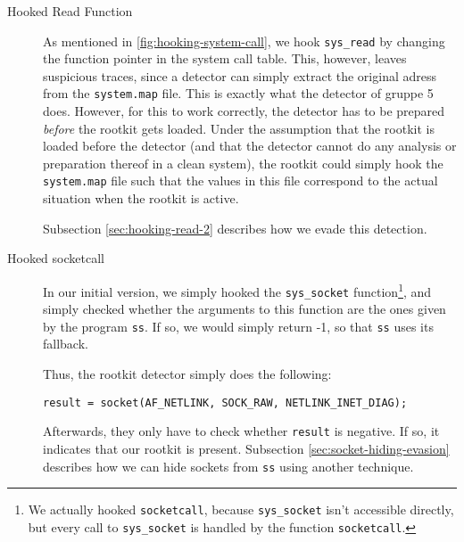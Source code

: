 \documentclass[10pt, letterpaper]{scrartcl}
\begin{document}
\begin{description}
\item[Hooked Read Function] As mentioned in \autoref{fig:hooking-system-call}, we hook \texttt{sys\_read} by changing the function pointer in the system call table. This, however, leaves suspicious traces, since a detector can simply extract the original adress from the \texttt{system.map} file. This is exactly what the detector of gruppe 5 does. However, for this to work correctly, the detector has to be prepared \textit{before} the rootkit gets loaded. Under the assumption that the rootkit is loaded before the detector (and that the detector cannot do any analysis or preparation thereof in a clean system), the rootkit could simply hook the \texttt{system.map} file such that the values in this file correspond to the actual situation when the rootkit is active.

Subsection \ref{sec:hooking-read-2} describes how we evade this detection.
\item[Hooked socketcall] In our initial version, we simply hooked the \texttt{sys\_socket} function\footnote{We actually hooked \texttt{socketcall}, because \texttt{sys\_socket} isn't accessible directly, but every call to \texttt{sys\_socket} is handled by the function \texttt{socketcall}.}, and simply checked whether the arguments to this function are the ones given by the program \texttt{ss}. If so, we would simply return -1, so that \texttt{ss} uses its fallback.

Thus, the rootkit detector simply does the following:

\begin{verbatim}
result = socket(AF_NETLINK, SOCK_RAW, NETLINK_INET_DIAG);
\end{verbatim}

Afterwards, they only have to check whether \texttt{result} is negative. If so, it indicates that our rootkit is present. Subsection \ref{sec:socket-hiding-evasion} describes how we can hide sockets from \texttt{ss} using another technique.


\end{description}
\end{document}
